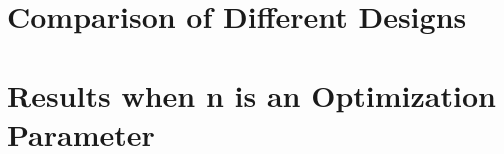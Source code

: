 \section{Comparison of Different Designs}
\label{sec:comparison}
\begin{table}[!h]
\begin{center}
 \caption{Comparison between the two designs' force capabilities.}\vspace{1ex}
 \label{tab:tab_all_compare_force}
\end{center}
\end{table}

\begin{table}[!h]
\begin{center}
 \caption{Comparison between the two designs' torque capabilities.}\vspace{1ex}
 \label{tab:tab_all_compare_torque}
\end{center}
\end{table}

\begin{table}[!h]
\begin{center}
 \caption{Comparison between two designs' hover capabilities.}\vspace{1ex}
 \label{tab:tab_all_compare_hover}
\end{center}
\end{table}

\section{Results when n is an Optimization Parameter}
\label{sec:result_n}
